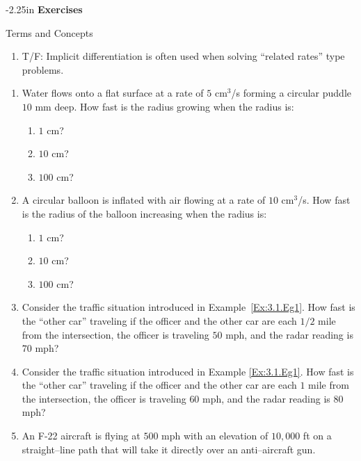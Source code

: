 \begin{adjustwidth*}{}{-2.25in}
\textbf{{\large Exercises}}
\setlength{\columnsep}{25pt}
\begin{multicols*}{2}
\noindent Terms and Concepts \small
\begin{enumerate}[1)]
\item T/F: Implicit differentiation is often used when solving ``related rates'' type problems.
\end{enumerate} 

 \small

\begin{enumerate}[1),resume]
\item Water flows onto a flat surface at a rate of $5$ cm$^3$/s forming a circular puddle $10$ mm deep. How fast is the radius growing when the radius is:
	\begin{enumerate}
	\item		$1$ cm?
	\item		$10$ cm?
	\item		$100$ cm?
	\end{enumerate}
	
\item A circular balloon is inflated with air flowing at a rate of $10$ cm$^3$/s. How fast is the radius of the balloon increasing when the radius is:
	\begin{enumerate}
	\item		$1$ cm?
	\item		$10$ cm?
	\item		$100$ cm?
	\end{enumerate}
	
\item Consider the traffic situation introduced in Example~\ref{Ex:3.1.Eg1}. How fast is the ``other car'' traveling if the officer and the other car are each $1/2$ mile from the intersection, the officer is traveling $50$ mph, and the radar reading is $70$ mph?

\item Consider the traffic situation introduced in Example \ref{Ex:3.1.Eg1}. How fast is the ``other car'' traveling if the officer and the other car are each $1$ mile from the intersection, the officer is traveling $60$ mph, and the radar reading is $80$ mph?

\item \label{exer:04_02_ex_07}An F-22 aircraft is flying at $500$ mph with an elevation of  $10,000$ ft on a straight--line path that will take it directly over an anti--aircraft gun. 


\end{enumerate}
\end{multicols*}
\end{adjustwidth*}
